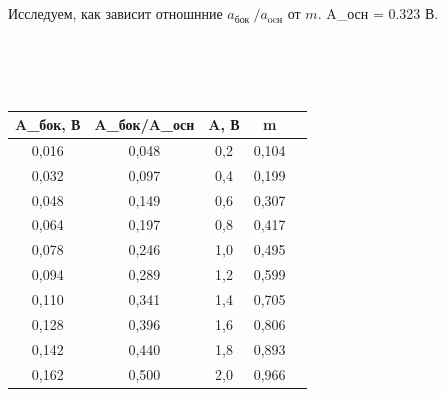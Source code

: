 \\
\
\\
\newpage

Исследуем, как зависит отношнние $a_{\text {бок }} / a_{\mathrm{ocн}}$ от $m$. A_{осн} = 0.323 В. 

\\
\
\\
\

\begin{minipage}{0.45\textwidth}
\begin{tabular}{|c|c|c|c|c|}
		\hline
	A_{бок}, В \cdot 10   &A_{бок}/A_{осн} & A, В & m \\ 
		\hline
   0,016     &  0,048    &   0,2    &     0,104   \\ 
		\hline
   0,032     &   0,097   &     0,4  &   0,199     \\ 
		\hline
	0,048	        &  0,149    & 0,6      &    0,307    \\ 
		\hline
		0,064        & 0,197     &  0,8     &   0,417     \\ 
		\hline
0,078		        &   0,246  &    1,0  &   0,495     \\ 
		\hline
	0,094	        &   0,289   &     1,2  &    0,599    \\ 
		\hline
	0,110	        &    0,341  &    1,4   &    0,705    \\ 
		\hline
	0,128	        &     0,396 &    1,6   &     0,806   \\ 
		\hline
	0,142	        &   0,440   &     1,8  &     0,893   \\ 
		\hline
	0,162	        &    0,500  &    2,0   &    0,966    \\ 
		\hline
	\end{tabular}
\end{minipage}
\begin{minipage}{0.04\textwidth}
\
\end{minipage}

